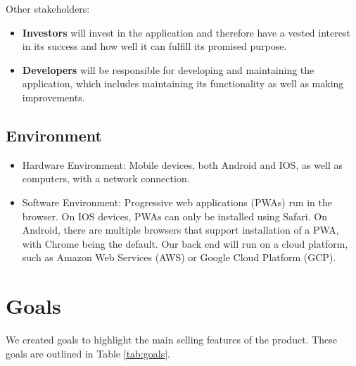 \documentclass{article}
\begin{document}
\noindent Other stakeholders:
\begin{itemize}
    \item \textbf{Investors} will invest in the application and therefore have a vested interest in its success and how well it can fulfill its promised purpose.
    \item \textbf{Developers} will be responsible for developing and maintaining the application, which includes maintaining its functionality as well as making improvements.
\end{itemize}
\subsection{Environment}

\begin{itemize}
    \item Hardware Environment: Mobile devices, both Android and IOS, as well as computers, with a network connection.
    \item Software Environment: Progressive web applications (PWAs) run in the browser. On IOS devices, PWAs can only be installed using Safari. On Android, there are multiple browsers that support installation of a PWA, with Chrome being the default. Our back end will run on a cloud platform, such as Amazon Web Services (AWS) or Google Cloud Platform (GCP).
\end{itemize}

\section{Goals}

We created goals to highlight the main selling features of the product. These goals are outlined in Table \ref{tab:goals}.
\end{document}
